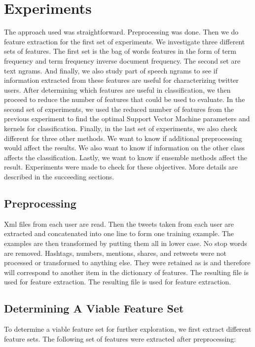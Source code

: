 \documentclass[a4paper]{llncs}
\begin{document}
\section{Experiments}
The approach used was straightforward. Preprocessing was done. Then we do feature extraction for the first set of experiments. We investigate three different sets of features. The first set is the bag of words features in the form of term frequency and term frequency inverse document frequency. The second set are text ngrams. And finally, we also study part of speech ngrams to see if information extracted from these features are useful for characterizing twitter users. After determining which features are useful in classification, we then proceed to reduce the number of features that could be used to evaluate. In the second set of experiments, we used the reduced number of features from the previous experiment to find the optimal Support Vector Machine parameters and kernels for classification. Finally, in the last set of experiments, we also check different for three other methods. We want to know if additional preprocessing would affect the results. We also want to know if information on the other class affects the classification. Lastly, we want to know if ensemble methods affect the result. Experiments were made to check for these objectives. More details are described in the succeeding sections.


\subsection{Preprocessing}
Xml files from each user are read. Then the tweets taken from each user are extracted and concatenated into one line to form one training example. The examples are then transformed by putting them all in lower case. No stop words are removed. Hashtags, numbers, mentions, shares, and retweets were not processed or transformed to anything else. They were retained as is and therefore will correspond to another item in the dictionary of features. The resulting file is used for feature extraction.  The resulting file is used for feature extraction.  

\subsection{Determining A Viable Feature Set}

To determine a viable feature set for further exploration, we first extract different feature sets. The following set of features were extracted after preprocessing: 
\end{document}
